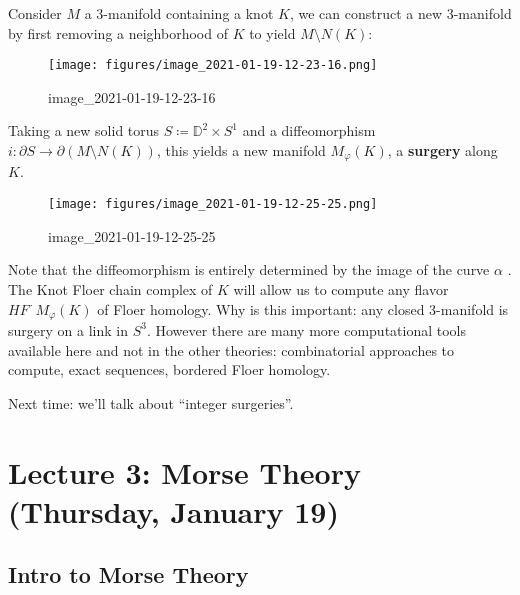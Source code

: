 \begin{definition}

Consider \(M\) a 3-manifold containing a knot \(K\), we can construct a
new 3-manifold by first removing a neighborhood of \(K\) to yield
\(M\setminus N(K)\):

\begin{figure}
\centering
\texttt{[image: figures/image\_2021-01-19-12-23-16.png]}
\caption{image\_2021-01-19-12-23-16}
\end{figure}

Taking a new solid torus \(S \coloneqq{\mathbb{D}}^2 \times S^1\) and a
diffeomorphism \(i: {{\partial}}S \to {{\partial}}(M \setminus N(K))\),
this yields a new manifold \(M _{\varphi} (K)\), a \textbf{surgery}
along \(K\).

\begin{figure}
\centering
\texttt{[image: figures/image\_2021-01-19-12-25-25.png]}
\caption{image\_2021-01-19-12-25-25}
\end{figure}

\end{definition}

\begin{remark}

Note that the diffeomorphism is entirely determined by the image of the
curve \(\alpha\) . The Knot Floer chain complex of \(K\) will allow us
to compute any flavor \(HF^{\,\cdot\,}M _{\varphi} (K)\) of Floer
homology. Why is this important: any closed 3-manifold is surgery on a
link in \(S^3\). However there are many more computational tools
available here and not in the other theories: combinatorial approaches
to compute, exact sequences, bordered Floer homology.

\end{remark}

Next time: we'll talk about ``integer surgeries''.

\hypertarget{lecture-3-morse-theory-thursday-january-19}{%
\section{Lecture 3: Morse Theory (Thursday, January
19)}\label{lecture-3-morse-theory-thursday-january-19}}

\hypertarget{intro-to-morse-theory}{%
\subsection{Intro to Morse Theory}\label{intro-to-morse-theory}}


